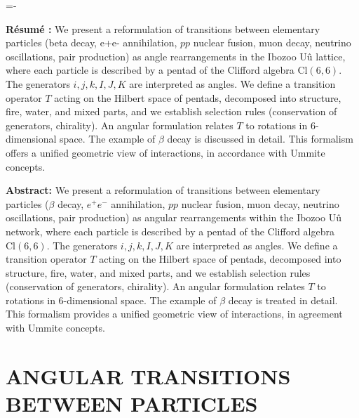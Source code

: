 \documentclass[11pt]{article}
\begin{document}
\newlength{\remaining}
\remaining=\dimexpr\textheight - \pagetotal\relax
\ifdim\abstractheight > \remaining
\enlargethispage{\dimexpr\abstractheight - \remaining\relax}
\fi
\begin{center}
\begin{minipage}{0.85\textwidth}
\noindent \textbf{Résumé :} We present a reformulation of transitions
between elementary particles (beta decay, e+e- annihilation, \(pp\)
nuclear fusion, muon decay, neutrino oscillations, pair production) as
angle rearrangements in the Ibozoo Uû lattice, where each particle is
described by a pentad of the Clifford algebra \(\text{Cl}(6,6)\). The
generators \(i,j,k,I,J,K\) are interpreted as angles. We define a
transition operator \(T\) acting on the Hilbert space of pentads,
decomposed into structure, fire, water, and mixed parts, and we
establish selection rules (conservation of generators, chirality). An
angular formulation relates \(T\) to rotations in 6-dimensional space.
The example of \(\beta\) decay is discussed in detail. This formalism
offers a unified geometric view of interactions, in accordance with
Ummite concepts.
\end{minipage}
\end{center}
\vspace{0.5cm}
\begin{center}
\begin{minipage}{0.85\textwidth}
\noindent \textbf{Abstract:} We present a reformulation of transitions
between elementary particles (\(\beta\) decay, \(e^+e^-\) annihilation,
\(pp\) nuclear fusion, muon decay, neutrino oscillations, pair
production) as angular rearrangements within the Ibozoo Uû network,
where each particle is described by a pentad of the Clifford algebra
\(\text{Cl}(6,6)\). The generators \(i,j,k,I,J,K\) are interpreted as
angles. We define a transition operator \(T\) acting on the Hilbert
space of pentads, decomposed into structure, fire, water, and mixed
parts, and we establish selection rules (conservation of generators,
chirality). An angular formulation relates \(T\) to rotations in
6-dimensional space. The example of \(\beta\) decay is treated in
detail. This formalism provides a unified geometric view of
interactions, in agreement with Ummite concepts.
\end{minipage}
\end{center}
\vspace{1cm}
\tableofcontents
\newpage
\clearpage
\pagestyle{fancy}
\hypertarget{angular-transitions-between-particles}{%
\section{ANGULAR TRANSITIONS BETWEEN
PARTICLES}\label{angular-transitions-between-particles}}
\end{document}
